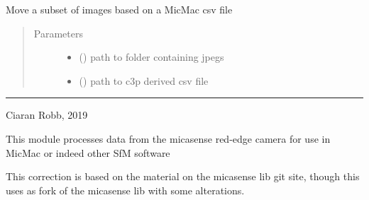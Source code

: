 \documentclass[letterpaper,10pt,english]{sphinxmanual}
\begin{document}

\begin{fulllineitems}
\label{\detokenize{pycmac:utilities.mv_subset}}
Move a subset of images based on a MicMac csv file
\begin{quote}\begin{description}
\item[{Parameters}] \leavevmode\begin{itemize}
\item {} 
 () \textendash{} path to folder containing jpegs

\item {} 
 () \textendash{} path to c3p derived csv file

\end{itemize}

\end{description}\end{quote}

\end{fulllineitems}



\bigskip\hrule\bigskip

\label{\detokenize{pycmac:module-mspec}}
Ciaran Robb, 2019


This module processes data from the micasense red-edge camera for use in MicMac
or indeed other SfM software

This correction is based on the material on the micasense lib git site,
though this uses as fork of the micasense lib with some alterations.

\begin{fulllineitems}
\label{\detokenize{pycmac:mspec.align_template}}
\end{fulllineitems}
\end{document}
